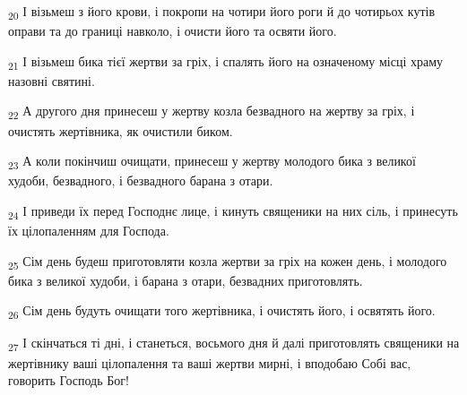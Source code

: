 \begin{tcolorbox}
\textsubscript{20} І візьмеш з його крови, і покропи на чотири його роги й до чотирьох кутів оправи та до границі навколо, і очисти його та освяти його.
\end{tcolorbox}
\begin{tcolorbox}
\textsubscript{21} І візьмеш бика тієї жертви за гріх, і спалять його на означеному місці храму назовні святині.
\end{tcolorbox}
\begin{tcolorbox}
\textsubscript{22} А другого дня принесеш у жертву козла безвадного на жертву за гріх, і очистять жертівника, як очистили биком.
\end{tcolorbox}
\begin{tcolorbox}
\textsubscript{23} А коли покінчиш очищати, принесеш у жертву молодого бика з великої худоби, безвадного, і безвадного барана з отари.
\end{tcolorbox}
\begin{tcolorbox}
\textsubscript{24} І приведи їх перед Господнє лице, і кинуть священики на них сіль, і принесуть їх цілопаленням для Господа.
\end{tcolorbox}
\begin{tcolorbox}
\textsubscript{25} Сім день будеш приготовляти козла жертви за гріх на кожен день, і молодого бика з великої худоби, і барана з отари, безвадних приготовлять.
\end{tcolorbox}
\begin{tcolorbox}
\textsubscript{26} Сім день будуть очищати того жертівника, і очистять його, і освятять його.
\end{tcolorbox}
\begin{tcolorbox}
\textsubscript{27} І скінчаться ті дні, і станеться, восьмого дня й далі приготовлять священики на жертівнику ваші цілопалення та ваші жертви мирні, і вподобаю Собі вас, говорить Господь Бог!
\end{tcolorbox}
